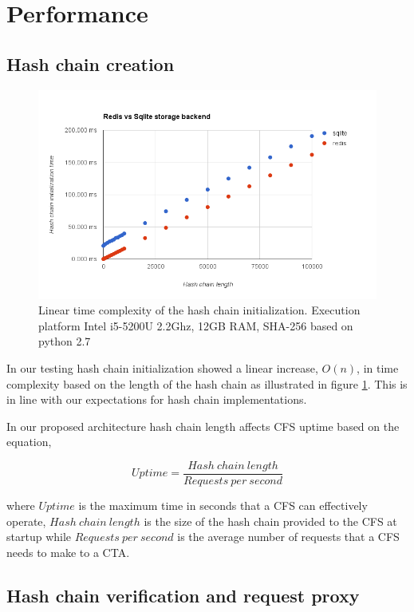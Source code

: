 \documentclass[a4paper,twoside]{article}
\begin{document}
\section{Performance}

\subsection{Hash chain creation}

\begin{figure}[h]
\includegraphics[width=\columnwidth]{performance}
\caption{Linear time complexity of the hash chain initialization. Execution platform Intel i5-5200U 2.2Ghz, 12GB RAM, SHA-256 based on python 2.7}
\label{fig:performance}
\end{figure}

In our testing hash chain initialization showed a linear increase, $O(n)$, in time complexity based on the length of the hash chain as illustrated in figure \ref{fig:performance}. This is in line with our expectations for hash chain implementations.

In our proposed architecture hash chain length affects CFS uptime based on the equation,

\[
	Uptime = \frac{Hash\ chain\ length}{Requests\ per\  second} 
\]

where $Uptime$ is the maximum time in seconds that a CFS can effectively operate, $Hash\ chain\ length$ is the size of the hash chain provided to the CFS at startup while $Requests\ per\ second$ is the average number of requests that a CFS needs to make to a CTA.


\subsection{Hash chain verification and request proxy}
\end{document}
